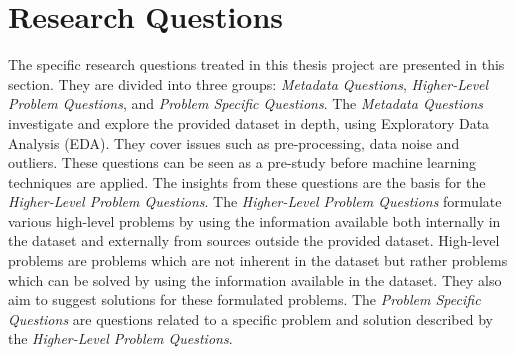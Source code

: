 \section{Research Questions}
\label{sec:research-questions}
The specific research questions treated in this thesis project are presented in this section.
They are divided into three groups: \textit{Metadata Questions}, \textit{Higher-Level Problem Questions}, and \textit{Problem Specific Questions}.
The \textit{Metadata Questions} investigate and explore the provided dataset in depth, using Exploratory Data Analysis (EDA).
They cover issues such as pre-processing, data noise and outliers.
These questions can be seen as a pre-study before machine learning techniques are applied.
The insights from these questions are the basis for the \textit{Higher-Level Problem Questions}.
The \textit{Higher-Level Problem Questions} formulate various high-level problems by using the information available both internally in the dataset and externally from sources outside the provided dataset.
High-level problems are problems which are not inherent in the dataset but rather problems which can be solved by using the information available in the dataset.
They also aim to suggest solutions for these formulated problems.
The \textit{Problem Specific Questions} are questions related to a specific problem and solution described by the \textit{Higher-Level Problem Questions}.

